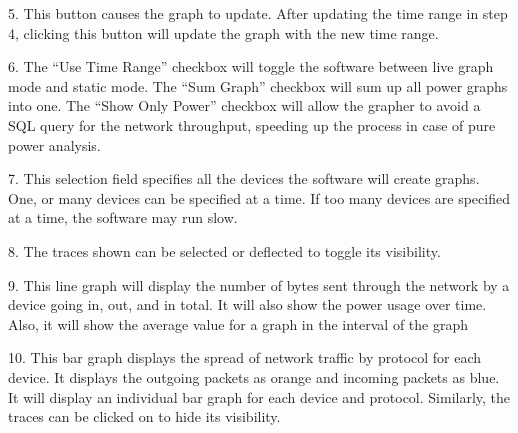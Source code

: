 5. This button causes the graph to update. After updating the time range in step 4, clicking this button will update the graph with the new time range.

6. The ``Use Time Range'' checkbox will toggle the software between live graph mode and static mode. The ``Sum Graph'' checkbox will sum up all power graphs into one. The ``Show Only Power'' checkbox will allow the grapher to avoid a SQL query for the network throughput, speeding up the process in case of pure power analysis.

7. This selection field specifies all the devices the software will create graphs. One, or many devices can be specified at a time. If too many devices are specified at a time, the software may run slow.

8. The traces shown can be selected or deflected to toggle its visibility.

9. This line graph will display the number of bytes sent through the network by a device going in, out, and in total. It will also show the power usage over time. Also, it will show the average value for a graph in the interval of the graph

10. This bar graph displays the spread of network traffic by protocol for each device. It displays the outgoing packets as orange and incoming packets as blue. It will display an individual bar graph for each device and protocol. Similarly, the traces can be clicked on to hide its visibility.

